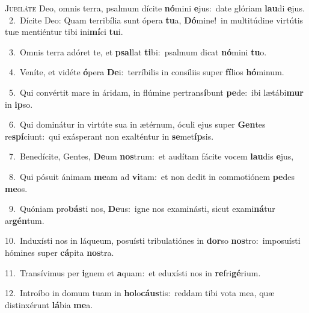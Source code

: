 \lettrine{\initial\textcolor{\initialcolor}{J}}{ubiláte} Deo, omnis terra, psalmum dícite \textbf{nó}\-mini \textbf{e}\-jus:~\star date glóriam \textbf{lau}\-di \textbf{e}\-jus.\\
{\numbfont\textcolor{\numbcolor}{~2.}}~Dícite Deo: Quam terribília sunt ópera \textbf{tu}\-a, \textbf{Dó}\-mine!~\star in multitúdine virtútis tuæ mentiéntur tibi ini\-\textbf{mí}\-ci \textbf{tu}\-i.\par
{\numbfont\textcolor{\numbcolor}{~3.}}~Omnis terra adóret te, et \textbf{psal}\-lat \textbf{ti}\-bi:~\star psalmum dicat \textbf{nó}\-mini \textbf{tu}\-o.\par
{\numbfont\textcolor{\numbcolor}{~4.}}~Veníte, et vidéte \textbf{ó}\-pera \textbf{De}\-i:~\star terríbilis in consíliis super \textbf{fí}\-lios \textbf{hó}\-minum.\par
{\numbfont\textcolor{\numbcolor}{~5.}}~Qui convértit mare in áridam, in flúmine pertrans\-\textbf{í}\-bunt \textbf{pe}\-de:~\star ibi lætábi\textbf{mur} in \textbf{ip}\-so.\par
{\numbfont\textcolor{\numbcolor}{~6.}}~Qui dominátur in virtúte sua in ætérnum, óculi ejus super \textbf{Gen}\-tes re\-\textbf{spí}\-ciunt:~\star qui exásperant non exalténtur in \textbf{se}\-met\-\textbf{íp}\-sis.\par
{\numbfont\textcolor{\numbcolor}{~7.}}~Benedícite, Gentes, \textbf{De}\-um \textbf{nos}\-trum:~\star et audítam fácite vocem \textbf{lau}\-dis \textbf{e}\-jus,\par
{\numbfont\textcolor{\numbcolor}{~8.}}~Qui pósuit ánimam \textbf{me}\-am ad \textbf{vi}\-tam:~\star et non dedit in commotiónem \textbf{pe}\-des \textbf{me}\-os.\par
{\numbfont\textcolor{\numbcolor}{~9.}}~Quóniam pro\-\textbf{bás}\-ti nos, \textbf{De}\-us:~\star igne nos examinásti, sicut exami\-\textbf{ná}\-tur ar\-\textbf{gén}\-tum.\par
{\numbfont\textcolor{\numbcolor}{10.}}~Induxísti nos in láqueum, posuísti tribulatiónes in \textbf{dor}\-so \textbf{nos}\-tro:~\star imposuísti hómines super \textbf{cá}\-pita \textbf{nos}\-tra.\par
{\numbfont\textcolor{\numbcolor}{11.}}~Transívimus per \textbf{i}\-gnem et \textbf{a}\-quam:~\star et eduxísti nos in \textbf{re}\-fri\-\textbf{gé}\-rium.\par
{\numbfont\textcolor{\numbcolor}{12.}}~Introíbo in domum tuam in \textbf{ho}\-lo\-\textbf{cáus}\-tis:~\star reddam tibi vota mea, quæ distinxérunt \textbf{lá}\-bia \textbf{me}\-a.\par
